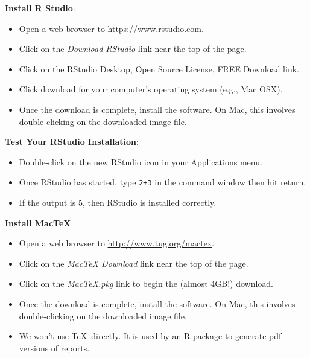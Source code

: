 \documentclass[10pt]{article}
\begin{document}
\textbf{Install R Studio}:
\begin{itemize}
\item Open a web browser to \href{https://www.rstudio.com}{https://www.rstudio.com}.
\item Click on the \textit{Download RStudio} link near the top of the page.
\item Click on the RStudio Desktop, Open Source License, FREE Download link.
\item Click download for your computer's operating system (e.g., Mac OSX).
\item Once the download is complete, install the software.  On Mac, this involves
  double-clicking on the downloaded image file.
\end{itemize}
\medskip


\textbf{Test Your RStudio Installation}:
\begin{itemize}
\item Double-click on the new RStudio icon in your Applications menu.
\item Once RStudio has started, type \texttt{2+3} in the command window then hit return.
\item If the output is 5, then RStudio is installed correctly.
\end{itemize}
\medskip

\textbf{Install MacTeX}:
\begin{itemize}
\item Open a web browser to \href{http://www.tug.org/mactex}{http://www.tug.org/mactex}.
\item Click on the \textit{MacTeX Download} link near the top of the page.
\item Click on the \textit{MacTeX.pkg} link to begin the (almost 4GB!) download.
\item Once the download is complete, install the software.  On Mac, this involves
  double-clicking on the downloaded image file.
\item We won't use \TeX\ directly.  It is used by an R package to generate pdf 
   versions of reports.
\end{itemize}
\medskip

\vfill
\eject
\end{document}
